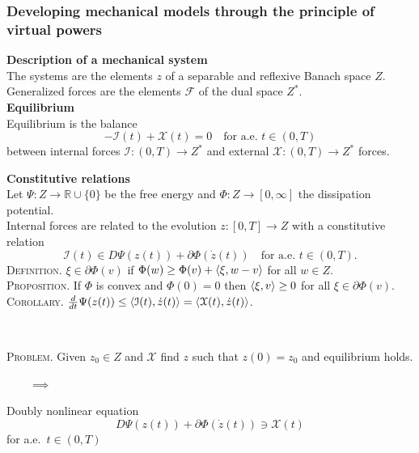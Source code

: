 \documentclass[8pt]{beamer}
\numberwithin{equation}{section}
\theoremstyle{definition}
\DeclarePairedDelimiter{\dual}{\langle}{\rangle}
\begin{document}
\begin{frame}
\frametitle{Developing mechanical models through the principle of virtual powers}
\centering
\begin{minipage}[c]{0.47\textwidth}
\textbf{Description of a mechanical system}
\\[0.5em]
The systems are the elements $z$ of a separable and reflexive Banach space $Z$.
\\[0.5em]
Generalized forces are the elements $\mathcal{F}$ of the dual space $Z^*$.
\\[1em]
\textbf{Equilibrium}
\\[0.5em]
Equilibrium is the balance
\[
-\mathcal{I}(t)+\mathcal{X}(t)=0\quad\text{for a.e.\ $t\in(0,T)$}
\]
between internal forces $\mathcal{I}\colon(0,T)\to Z^*$ and external $\mathcal{X}\colon(0,T)\to Z^*$ forces.
\end{minipage}
\hspace{0.02\textwidth}
\begin{minipage}[c]{0.47\textwidth}
\textbf{Constitutive relations}
\\[0.5em]
Let $\Psi\colon Z\to\mathbb{R}\cup\{0\}$ be the free energy and $\Phi\colon Z\to[0,\infty]$ the dissipation potential.
\\[0.5em]
Internal forces are related to the evolution $z\colon[0,T]\to Z$ with a constitutive relation
\[
\mathcal{I}(t)\in D\Psi(z(t))+\partial\Phi(\dot z(t))\quad\text{for a.e.\ $t\in(0,T)$}.
\]
\textsc{Definition.} $\xi\in\partial\Phi(v)$ if $\Phi(w)\ge\Phi(v)+\dual{\xi,w-v}$ for all $w\in Z$.
\\[0.5em]
\textsc{Proposition.} If $\Phi$ is convex and $\Phi(0)=0$ then $\dual{\xi,v}\ge0$ for all $\xi\in\partial\Phi(v)$.
\\[0.5em]
\textsc{Corollary.} $\frac{d}{dt}\Psi(z(t))\le\dual{\mathcal{I}(t),\dot z(t)}=\dual{\mathcal{X}(t),\dot z(t)}$.
\end{minipage}
\\[2em]
\begin{minipage}[c]{0.4\textwidth}
\textsc{Problem.} Given $z_0\in Z$ and $\mathcal{X}$ find $z$ such that $z(0)=z_0$ and equilibrium holds.
\end{minipage}
$\qquad\implies\qquad$
\begin{minipage}[c]{0.4\textwidth}
Doubly nonlinear equation
\[
D\Psi(z(t))+\partial\Phi(\dot z(t))\ni\mathcal{X}(t)
\]
for a.e.\ $t\in(0,T)$
\end{minipage}
\end{frame}
\end{document}
